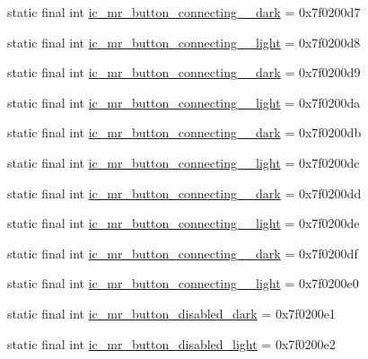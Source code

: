 \begin{CompactItemize}
\item 
static final int \hyperlink{classandroid_1_1support_1_1v4_1_1_r_1_1drawable_86d82b45d407332fe49f6c7f08e7a87d}{ic\_\-mr\_\-button\_\-connecting\_\_\-dark} = 0x7f0200d7
\item 
static final int \hyperlink{classandroid_1_1support_1_1v4_1_1_r_1_1drawable_9fe88eb297bc980de70312c7343b5793}{ic\_\-mr\_\-button\_\-connecting\_\_\-light} = 0x7f0200d8
\item 
static final int \hyperlink{classandroid_1_1support_1_1v4_1_1_r_1_1drawable_91b6cd2f642eff24be6058d302d910a4}{ic\_\-mr\_\-button\_\-connecting\_\_\-dark} = 0x7f0200d9
\item 
static final int \hyperlink{classandroid_1_1support_1_1v4_1_1_r_1_1drawable_1b169edd19455f3e475dc4f64a55b12b}{ic\_\-mr\_\-button\_\-connecting\_\_\-light} = 0x7f0200da
\item 
static final int \hyperlink{classandroid_1_1support_1_1v4_1_1_r_1_1drawable_f5cf36fb9ae103865b4c056e6c3f143c}{ic\_\-mr\_\-button\_\-connecting\_\_\-dark} = 0x7f0200db
\item 
static final int \hyperlink{classandroid_1_1support_1_1v4_1_1_r_1_1drawable_d3ba2f5fb95ba7581250de26e25878ab}{ic\_\-mr\_\-button\_\-connecting\_\_\-light} = 0x7f0200dc
\item 
static final int \hyperlink{classandroid_1_1support_1_1v4_1_1_r_1_1drawable_91d64473b785bc2e1268fddaf59b83bd}{ic\_\-mr\_\-button\_\-connecting\_\_\-dark} = 0x7f0200dd
\item 
static final int \hyperlink{classandroid_1_1support_1_1v4_1_1_r_1_1drawable_3adf10fb5ad24400487dfa471a4f179d}{ic\_\-mr\_\-button\_\-connecting\_\_\-light} = 0x7f0200de
\item 
static final int \hyperlink{classandroid_1_1support_1_1v4_1_1_r_1_1drawable_fe199866dfa367b3f3aaa6d99812e938}{ic\_\-mr\_\-button\_\-connecting\_\_\-dark} = 0x7f0200df
\item 
static final int \hyperlink{classandroid_1_1support_1_1v4_1_1_r_1_1drawable_714e56c8ac12ae3720c3afb8254407b5}{ic\_\-mr\_\-button\_\-connecting\_\_\-light} = 0x7f0200e0
\item 
static final int \hyperlink{classandroid_1_1support_1_1v4_1_1_r_1_1drawable_dbf5b903380206323934106a3a6ce5cc}{ic\_\-mr\_\-button\_\-disabled\_\-dark} = 0x7f0200e1
\item 
static final int \hyperlink{classandroid_1_1support_1_1v4_1_1_r_1_1drawable_1584c63ca6ae859c37ad3d0ec3337670}{ic\_\-mr\_\-button\_\-disabled\_\-light} = 0x7f0200e2

\end{CompactItemize}
